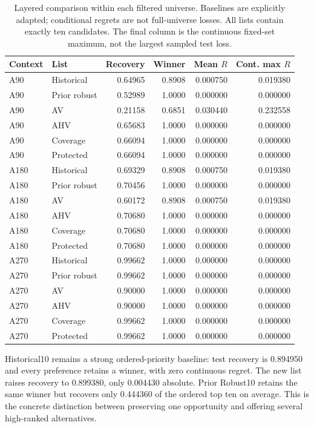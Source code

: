 \documentclass{llncs}
\begin{document}
\begin{table}[tbp]\centering\small\caption{Layered comparison within each filtered universe. Baselines are explicitly adapted; conditional regrets are not full-universe losses. All lists contain exactly ten candidates. The final column is the continuous fixed-set maximum, not the largest sampled test loss.}\label{tab:comparison2}
\begin{tabular}{llrrrr}\toprule
Context & List & Recovery & Winner & Mean $R$ & Cont. max $R$\\\midrule
A90 & Historical & 0.64965 & 0.8908 & 0.000750 & 0.019380\\
A90 & Prior robust & 0.52989 & 1.0000 & 0.000000 & 0.000000\\
A90 & AV & 0.21158 & 0.6851 & 0.030440 & 0.232558\\
A90 & AHV & 0.65683 & 1.0000 & 0.000000 & 0.000000\\
A90 & Coverage & 0.66094 & 1.0000 & 0.000000 & 0.000000\\
A90 & Protected & 0.66094 & 1.0000 & 0.000000 & 0.000000\\
A180 & Historical & 0.69329 & 0.8908 & 0.000750 & 0.019380\\
A180 & Prior robust & 0.70456 & 1.0000 & 0.000000 & 0.000000\\
A180 & AV & 0.60172 & 0.8908 & 0.000750 & 0.019380\\
A180 & AHV & 0.70680 & 1.0000 & 0.000000 & 0.000000\\
A180 & Coverage & 0.70680 & 1.0000 & 0.000000 & 0.000000\\
A180 & Protected & 0.70680 & 1.0000 & 0.000000 & 0.000000\\
A270 & Historical & 0.99662 & 1.0000 & 0.000000 & 0.000000\\
A270 & Prior robust & 0.99662 & 1.0000 & 0.000000 & 0.000000\\
A270 & AV & 0.90000 & 1.0000 & 0.000000 & 0.000000\\
A270 & AHV & 0.90000 & 1.0000 & 0.000000 & 0.000000\\
A270 & Coverage & 0.99662 & 1.0000 & 0.000000 & 0.000000\\
A270 & Protected & 0.99662 & 1.0000 & 0.000000 & 0.000000\\
\bottomrule\end{tabular}\end{table}


Historical10 remains a strong ordered-priority baseline: test recovery is 0.894950 and every preference retains a winner, with zero continuous regret. The new list raises recovery to 0.899380, only 0.004430 absolute. Prior Robust10 retains the same winner but recovers only 0.444360 of the ordered top ten on average. This is the concrete distinction between preserving one opportunity and offering several high-ranked alternatives.
\end{document}
